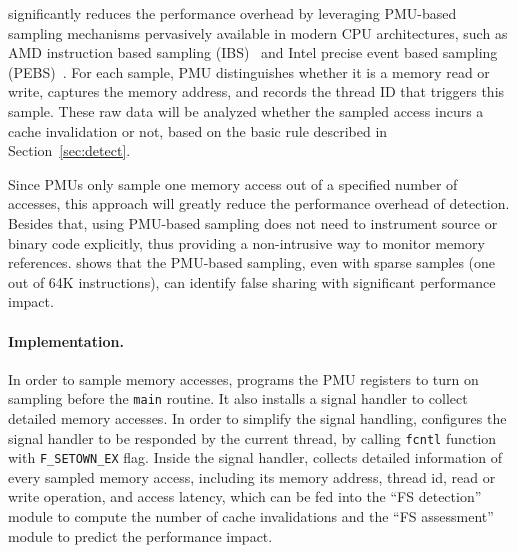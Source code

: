 \cheetah{} significantly reduces the performance overhead by leveraging PMU-based sampling mechanisms pervasively available in modern CPU architectures, such as AMD instruction based sampling (IBS)~\cite{AMDIBS:07} and Intel precise event based sampling (PEBS)~\cite{IntelArch:PEBS:Sept09}. For each sample, PMU distinguishes whether it is a memory read or write, captures the memory address, and records the thread ID that triggers this sample. These raw data will be analyzed whether the sampled access incurs a cache invalidation or not, based on the basic rule described in Section~\ref{sec:detect}.

Since PMUs only sample one memory access out of a specified number of accesses, this approach will greatly reduce the performance overhead of detection. Besides that, using PMU-based sampling does not need to instrument source or binary code explicitly, thus providing a non-intrusive way to monitor memory references. \cheetah{} shows that the PMU-based sampling, even with sparse samples (one out of 64K instructions), can identify false sharing with significant performance impact.
 

\paragraph{Implementation.} 

In order to sample memory accesses, \cheetah{} programs the PMU registers to turn on sampling before the \texttt{main} routine. It also installs a signal handler to collect detailed memory accesses. In order to simplify the signal handling, \Cheetah{} configures the signal handler to be responded by the current thread, by calling \texttt{fcntl} function with \texttt{F\_SETOWN\_EX} flag. Inside the signal handler, \Cheetah{} collects detailed information of every sampled memory access, including its memory address, thread id, read or write operation, and access latency, which can be fed into the ``FS detection'' module to compute the number of cache invalidations and the ``FS assessment'' module to predict the performance impact.


